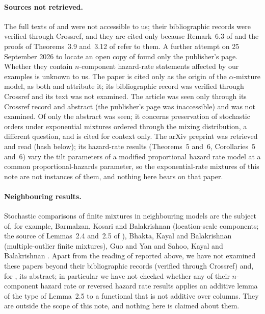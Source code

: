 \documentclass[10pt]{article}
\theoremstyle{plain}
\theoremstyle{definition}
\theoremstyle{remark}
\begin{document}
\paragraph{Sources not retrieved.} The full texts of \cite{HazraFinkelstein2018} and \cite{NadebTorabi2022} were not accessible to us; their bibliographic records were verified through Crossref, and they are cited only because Remark~6.3 of \cite{ShojaeeAsadiFinkelstein2022} and the proofs of Theorems~3.9 and~3.12 of \cite{SahooKayalFinkelstein2026} refer to them. A further attempt on 25 September 2026 to locate an open copy of \cite{HazraFinkelstein2018} found only the publisher's page. Whether they contain $n$-component hazard-rate statements affected by our examples is unknown to us. The paper \cite{AsadiEbrahimiSoofi2019} is cited only as the origin of the $\alpha$-mixture model, as both \cite{ShojaeeAsadiFinkelstein2022} and \cite{SahooKayalFinkelstein2026} attribute it; its bibliographic record was verified through Crossref and its text was not examined. The article \cite{SahooKayalBalakrishnan2026} was seen only through its Crossref record and abstract (the publisher's page was inaccessible) and was not examined. Of \cite{BartoszewiczSkolimowska2006} only the abstract was seen; it concerns preservation of stochastic orders under exponential mixtures ordered through the mixing distribution, a different question, and is cited for context only. The arXiv preprint \cite{GuoYan2024} was retrieved and read (hash below); its hazard-rate results (Theorems~5 and~6, Corollaries~5 and~6) vary the tilt parameters of a modified proportional hazard rate model at a common proportional-hazards parameter, so the exponential-rate mixtures of this note are not instances of them, and nothing here bears on that paper.

\paragraph{Neighbouring results.} Stochastic comparisons of finite mixtures in neighbouring models are the subject of, for example, Barmalzan, Kosari and Balakrishnan \cite{BarmalzanKosariBalakrishnan2022} (location-scale components; the source of Lemmas~2.4 and~2.5 of \cite{SahooKayalFinkelstein2026}), Bhakta, Kayal and Balakrishnan \cite{BhaktaKayalBalakrishnan2024} (multiple-outlier finite mixtures), Guo and Yan \cite{GuoYan2024} and Sahoo, Kayal and Balakrishnan \cite{SahooKayalBalakrishnan2026}. Apart from the reading of \cite{GuoYan2024} reported above, we have not examined these papers beyond their bibliographic records (verified through Crossref) and, for \cite{SahooKayalBalakrishnan2026}, its abstract; in particular we have not checked whether any of their $n$-component hazard rate or reversed hazard rate results applies an additive lemma of the type of Lemma~2.5 to a functional that is not additive over columns. They are outside the scope of this note, and nothing here is claimed about them.
\end{document}
